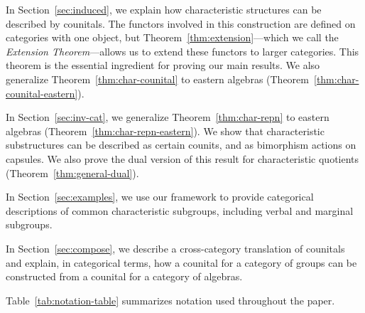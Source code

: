 \documentclass{amsart}
\numberwithin{lstfloat}{section}
\theoremstyle{definition}
\theoremstyle{remark}
\numberwithin{equation}{section}
\begin{document}
In Section~\ref{sec:induced}, we explain how characteristic structures can be
described by counitals.  
The functors involved in this construction are defined on categories with one
object, but Theorem~\ref{thm:extension}---which we call the \emph{Extension
Theorem}---allows us to extend these functors to larger categories. This theorem
is the essential ingredient for proving  our main results. We  also generalize
Theorem~\ref{thm:char-counital} to eastern algebras
(Theorem~\ref{thm:char-counital-eastern}).

 In Section~\ref{sec:inv-cat}, we generalize  Theorem~\ref{thm:char-repn} to eastern
algebras (Theorem~\ref{thm:char-repn-eastern}). We show that characteristic
substructures can be described as certain counits, and as bimorphism actions on
capsules. We also prove the dual version of this result for characteristic
quotients (Theorem~\ref{thm:general-dual}).

In Section~\ref{sec:examples}, we use our framework to provide categorical
descriptions of common characteristic subgroups, including verbal and marginal
subgroups. 

In Section~\ref{sec:compose}, we describe a cross-category translation of
counitals and explain, in categorical terms, how a counital for a category of
groups can be constructed from a counital for a  category of algebras.

Table~\ref{tab:notation-table} summarizes notation used throughout the
paper. 
\end{document}
